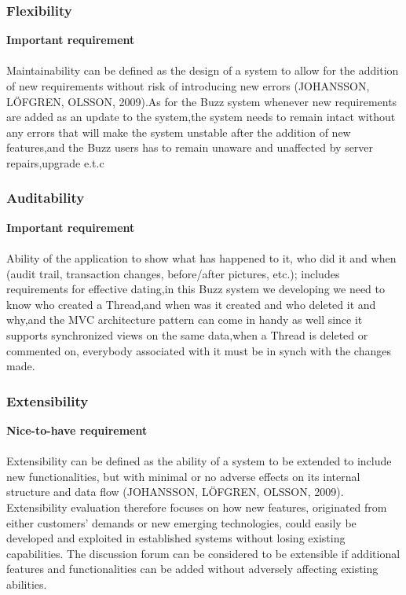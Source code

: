 \documentclass[a4paper]{article}
\begin{document}
\subsubsection{Flexibility}
\textbf{Important requirement}
\\
\\Maintainability can be defined as the design of a system to allow for the addition of new requirements without risk of introducing new errors (JOHANSSON, LÖFGREN, OLSSON, 2009).As for the Buzz system whenever new requirements are added as an update to the system,the system needs to remain intact without any errors that will make the system unstable after the addition of new features,and the Buzz users has to remain unaware and unaffected by server repairs,upgrade e.t.c


\subsubsection{Auditability}
\textbf{Important requirement}
\\
\\Ability of the application to show what has happened to it, who did it and when (audit trail, transaction changes, before/after pictures, etc.); includes requirements for effective dating,in this Buzz system we developing we need to know who created a Thread,and when was it created and who deleted it and why,and the MVC architecture pattern can come in handy as well since it supports synchronized views on the same data,when a Thread is deleted or commented on, everybody associated with it must be in synch with the changes made.


\subsubsection{Extensibility}
\textbf{Nice-to-have requirement}
\\
\\Extensibility can be defined as the ability of a system to be extended to include new functionalities, but with minimal or no adverse effects on its internal structure and data flow (JOHANSSON, LÖFGREN, OLSSON, 2009).  Extensibility evaluation therefore focuses on how new features, originated from either customers’ demands or new emerging technologies, could easily be developed and exploited in established systems without losing existing capabilities. The discussion forum can be considered to be extensible if additional features and functionalities can be added without adversely affecting existing abilities.
\end{document}
